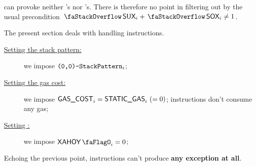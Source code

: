 \begin{center}
\end{center}
\saNote{}  can provoke neither \suxSH{}'s nor \soxSH{}'s.
There is therefore no point in filtering out by the usual precondition
$\stackSux_{i} + \stackSox_{i} \neq 1$.

The present section deals with handling  instructions.
\begin{description}
	\item[\underline{Setting the stack pattern:}] we impose $\texttt{(0,0)-}\texttt{StackPattern}_{i}$;
	\item[\underline{Setting the gas cost:}] we impose $\textsf{GAS}\textsf{\_COST}_{i} = \textsf{STATIC\_GAS}_{i} ~ (=0)$;
		 instructions don't consume any gas;
	\item[\underline{Setting \xAhoy:}] we impose $\xAhoy_{i} = 0$;
\end{description}
\saNote{} Echoing the previous point,  instructions can't produce \textbf{any exception at all}.
